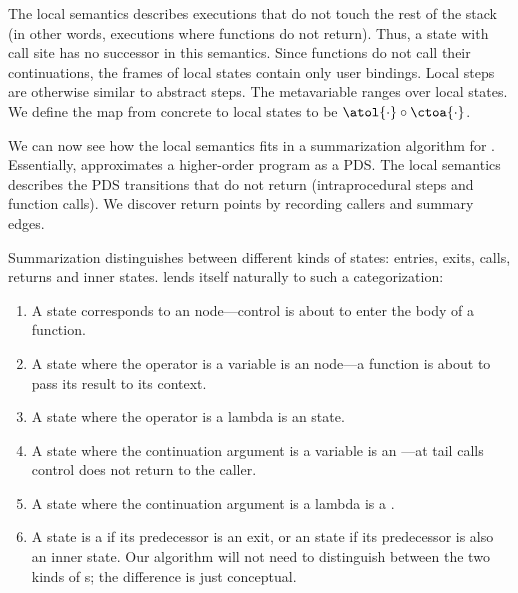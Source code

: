 \documentclass{LMCS}
\theoremstyle{definition} \newtheorem{property}[thm]{Property}
\begin{document}
The local semantics describes executions that do not touch the rest of the stack
(in other words, executions where functions do not return).
Thus, a \dlceval{} state with call site \kcall{} has no successor in this 
semantics.
Since functions do not call their continuations, the frames of local states 
contain only user bindings.
Local steps are otherwise similar to abstract steps.
The metavariable \lstat{} ranges over local states.
We define the map \ctol{\cdot} from concrete to local states to be
$\atol{\cdot} \circ \ctoa{\cdot}$.

We can now see how the local semantics fits in a summarization algorithm for
\cfat.
Essentially, \cfat{} approximates a higher-order program as a PDS.
The local semantics describes the PDS transitions that do not return
(intraprocedural steps and function calls).
We discover return points by recording callers and summary edges.

Summarization distinguishes between different kinds of states: entries, exits, 
calls, returns and inner states.
\cps{} lends itself naturally to such a categorization:
\begin{enumerate}[$\bullet$]
\item
  A \dluapply{} state corresponds to an  node---control is about to 
  enter the body of a function.
\item
  A \dlceval{} state where the operator is a variable is an  
  node---a function is about to pass its result to its context.
\item
  A \dlceval{} state where the operator is a lambda is an  state.
\item
  A \dlueval{} state where the continuation argument is a variable 
  is an ---at tail calls control does not return to the caller.
\item
  A \dlueval{} state where the continuation argument is a lambda is a .
\item
  A \dlcapply{} state is a  if its predecessor is an exit, 
  or an  state if its predecessor is also an inner state.
  Our algorithm will not need to distinguish between the two kinds of
  \dlcapply{}s; the difference is just conceptual.
\end{enumerate}\medskip
\end{document}
